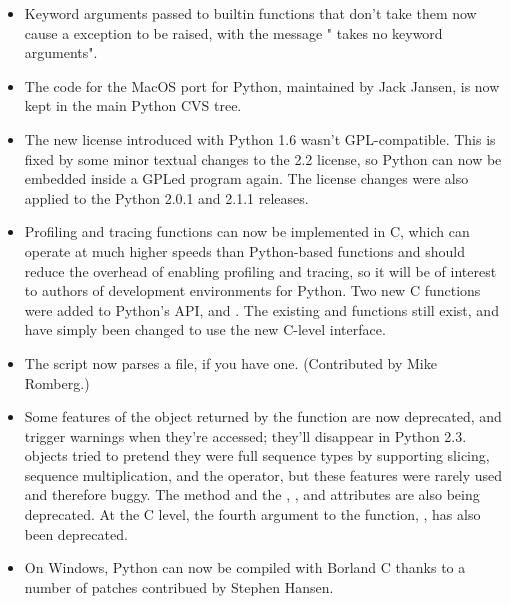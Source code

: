\documentclass{howto}
\begin{document}
\begin{itemize}

  \item Keyword arguments passed to builtin functions that don't take them
  now cause a  exception to be raised, with the
  message " takes no keyword arguments".
  
  \item The code for the MacOS port for Python, maintained by Jack
  Jansen, is now kept in the main Python CVS tree.

  \item The new license introduced with Python 1.6 wasn't
  GPL-compatible.  This is fixed by some minor textual changes to the
  2.2 license, so Python can now be embedded inside a GPLed program
  again.  The license changes were also applied to the Python 2.0.1
  and 2.1.1 releases.

  \item Profiling and tracing functions can now be implemented in C,
  which can operate at much higher speeds than Python-based functions
  and should reduce the overhead of enabling profiling and tracing, so
  it will be of interest to authors of development environments for
  Python.  Two new C functions were added to Python's API,
   and .
  The existing  and
   functions still exist, and have simply
  been changed to use the new C-level interface.

  \item The  script
  now parses a  file, if you have one.
  (Contributed by Mike Romberg.) 

  \item Some features of the object returned by the
   function are now deprecated, and trigger
  warnings when they're accessed; they'll disappear in Python 2.3.
   objects tried to pretend they were full sequence
  types by supporting slicing, sequence multiplication, and the
   operator, but these features were rarely used and
  therefore buggy.  The  method and the
  , , and  attributes are also
  being deprecated.  At the C level, the fourth argument to the
   function, , has also been
  deprecated.

  \item On Windows, Python can now be compiled with Borland C thanks 
  to a number of patches contribued by Stephen Hansen.


\end{itemize}
\end{document}
